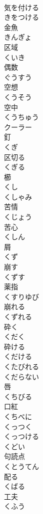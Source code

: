 \documentclass[8pt]{extreport}
\begin{document}
\begin{CJK}{UTF8}{min}
\\	気を付ける 
\\	きをつける	
\\	金魚 
\\	きんぎょ	
\\	区域 
\\	くいき	
\\	偶数 
\\	ぐうすう	
\\	空想 
\\	くうそう	
\\	空中 
\\	くうちゅう	
\\	クーラー	
\\	釘 
\\	くぎ	
\\	区切る 
\\	くぎる	
\\	櫛 
\\	くし	
\\	くしゃみ	
\\	苦情 
\\	くじょう	
\\	苦心 
\\	くしん	
\\	屑 
\\	くず	
\\	崩す 
\\	くずす	
\\	薬指 
\\	くすりゆび	
\\	崩れる 
\\	くずれる	
\\	砕く 
\\	くだく	
\\	砕ける 
\\	くだける	
\\	くたびれる	
\\	くだらない	
\\	唇 
\\	くちびる	
\\	口紅 
\\	くちべに	
\\	くっつく	
\\	くっつける	
\\	くどい	
\\	句読点 
\\	くとうてん	
\\	配る 
\\	くばる	
\\	工夫 
\\	くふう	

\end{CJK}
\end{document}
